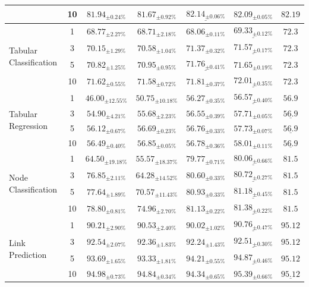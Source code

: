 \documentclass{article}
\begin{document}
\begin{longtable}{@{}p{}cccccc@{}}
& 10 & $81.94_{\pm0.24\%}$ & $81.67_{\pm0.92\%}$ & $\underline{82.14_{\pm0.06\%}}$ & $82.09_{\pm0.05\%}$ & $\mathbf{82.19}$ \\
\midrule
\multirow{4}{=}{Tabular Classification} 
& 1 & $68.77_{\pm2.27\%}$ & $68.71_{\pm2.18\%}$ & $68.06_{\pm0.11\%}$ & $\underline{69.33_{\pm0.12\%}}$ & $\mathbf{72.3}$ \\
& 3 & $70.15_{\pm1.29\%}$ & $70.58_{\pm1.04\%}$ & $71.37_{\pm0.32\%}$ & $\underline{71.57_{\pm0.17\%}}$ & $\mathbf{72.3}$ \\
& 5 & $70.82_{\pm1.25\%}$ & $70.95_{\pm0.95\%}$ & $\underline{71.76_{\pm0.41\%}}$ & $71.65_{\pm0.19\%}$ & $\mathbf{72.3}$ \\
& 10 & $71.62_{\pm0.55\%}$ & $71.58_{\pm0.72\%}$ & $71.81_{\pm0.37\%}$ & $\underline{72.01_{\pm0.35\%}}$ & $\mathbf{72.3}$ \\
\midrule
\multirow{4}{=}{Tabular Regression} 
& 1 & $46.00_{\pm12.55\%}$ & $50.75_{\pm10.18\%}$ & $56.27_{\pm0.35\%}$ & $\underline{56.57_{\pm0.40\%}}$ & $\mathbf{56.9}$ \\
& 3 & $54.90_{\pm4.21\%}$  & $55.68_{\pm2.23\%}$  & $56.55_{\pm0.39\%}$ & $\mathbf{57.71_{\pm0.05\%}}$ & $\underline{56.9}$ \\
& 5 & $56.12_{\pm0.67\%}$  & $56.69_{\pm0.23\%}$  & $56.76_{\pm0.33\%}$ & $\mathbf{57.73_{\pm0.07\%}}$ & $\underline{56.9}$ \\
& 10 & $56.49_{\pm0.40\%}$ & $56.85_{\pm0.05\%}$ & $56.78_{\pm0.36\%}$ & $\mathbf{58.01_{\pm0.11\%}}$ & $\underline{56.9}$ \\

\midrule
\multirow{4}{=}{Node Classification} 
& 1 & $64.50_{\pm19.18\%}$ & $55.57_{\pm18.37\%}$ & $79.77_{\pm0.71\%}$ & $\underline{80.06_{\pm0.66\%}}$ & $\mathbf{81.5}$ \\
& 3 & $76.85_{\pm2.11\%}$ & $64.28_{\pm14.52\%}$ & $80.60_{\pm0.33\%}$ & $\underline{80.72_{\pm0.27\%}}$ & $\mathbf{81.5}$ \\
& 5 & $77.64_{\pm1.89\%}$ & $70.57_{\pm11.43\%}$ & $80.93_{\pm0.33\%}$ & $\underline{81.18_{\pm0.45\%}}$ & $\mathbf{81.5}$ \\
& 10 & $78.80_{\pm0.81\%}$ & $74.96_{\pm2.70\%}$ & $81.13_{\pm0.22\%}$ & $\underline{81.38_{\pm0.22\%}}$ & $\mathbf{81.5}$ \\
\midrule
\multirow{4}{=}{Link Prediction} 
& 1 & $90.21_{\pm2.90\%}$ & $90.53_{\pm2.40\%}$ & $90.02_{\pm1.02\%}$ & $\underline{90.76_{\pm0.47\%}}$ & $\mathbf{95.12}$ \\
& 3 & $92.54_{\pm2.07\%}$ & $92.36_{\pm1.83\%}$ & $92.24_{\pm1.43\%}$ & $\underline{92.51_{\pm0.30\%}}$ & $\mathbf{95.12}$ \\
& 5 & $93.69_{\pm1.65\%}$ & $93.33_{\pm1.81\%}$ & $94.21_{\pm0.55\%}$ & $\underline{94.87_{\pm0.46\%}}$ & $\mathbf{95.12}$ \\
& 10 & $94.98_{\pm0.73\%}$ & $94.84_{\pm0.34\%}$ & $94.34_{\pm0.65\%}$ & $\mathbf{95.39_{\pm0.66\%}}$ & $\underline{95.12}$ \\




\bottomrule
\end{longtable}
\end{document}
